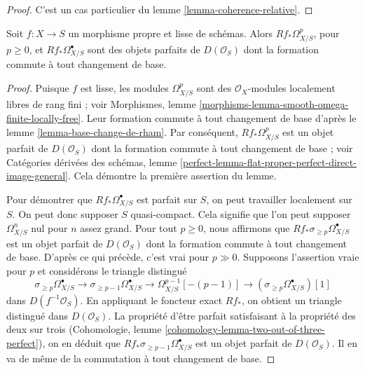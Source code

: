 \begin{proof}
C'est un cas particulier du lemme \ref{lemma-coherence-relative}.
\end{proof}

\begin{lemma}
\label{lemma-proper-smooth-de-Rham}
Soit $f : X \to S$ un morphisme propre et lisse de schémas. Alors
$Rf_*\Omega^p_{X/S}$, pour $p \geq 0$, et $Rf_*\Omega^\bullet_{X/S}$ sont
des objets parfaits de $D(\mathcal{O}_S)$ dont la formation commute
à tout changement de base.
\end{lemma}

\begin{proof}
Puisque $f$ est lisse, les modules $\Omega^p_{X/S}$ sont des
$\mathcal{O}_X$-modules localement libres de rang fini ; voir Morphismes, lemme
\ref{morphisms-lemma-smooth-omega-finite-locally-free}. Leur
formation commute à tout changement de base d'après
le lemme \ref{lemma-base-change-de-rham}. Par conséquent,
$Rf_*\Omega^p_{X/S}$ est un objet parfait de $D(\mathcal{O}_S)$
dont la formation commute à tout changement de base ; voir
Catégories dérivées des schémas, lemme
\ref{perfect-lemma-flat-proper-perfect-direct-image-general}.
Cela démontre la première assertion du lemme.

\medskip\noindent
Pour démontrer que $Rf_*\Omega^\bullet_{X/S}$ est parfait sur $S$, on peut travailler
localement sur $S$. On peut donc supposer $S$ quasi-compact. Cela signifie
que l'on peut supposer $\Omega^n_{X/S}$ nul pour $n$ assez grand.
Pour tout $p \geq 0$, nous affirmons que
$Rf_*\sigma_{\geq p}\Omega^\bullet_{X/S}$ est un
objet parfait de $D(\mathcal{O}_S)$ dont la formation commute
à tout changement de base. D'après ce qui précède,
c'est vrai pour $p \gg 0$. Supposons l'assertion vraie pour $p$
et considérons le triangle distingué
$$
\sigma_{\geq p}\Omega^\bullet_{X/S} \to
\sigma_{\geq p - 1}\Omega^\bullet_{X/S} \to
\Omega^{p - 1}_{X/S}[-(p - 1)] \to
(\sigma_{\geq p}\Omega^\bullet_{X/S})[1]
$$
dans $D(f^{-1}\mathcal{O}_S)$.
En appliquant le foncteur exact $Rf_*$, on obtient un triangle distingué
dans $D(\mathcal{O}_S)$.
La propriété d'être parfait satisfaisant à la propriété des deux sur trois
(Cohomologie, lemme \ref{cohomology-lemma-two-out-of-three-perfect}),
on en déduit que $Rf_*\sigma_{\geq p - 1}\Omega^\bullet_{X/S}$ est un
objet parfait de $D(\mathcal{O}_S)$. Il en va de même de la
commutation à tout changement de base.
\end{proof}





